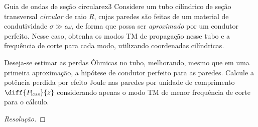 \begin{exercício}{Guia de ondas de seção circular}{ex3}
    Considere um tubo cilíndrico de seção transversal \emph{circular} de raio \(R\), cujas paredes são feitas de um material de condutividade \(\sigma \gg \epsilon \omega\), de forma que possa ser \emph{aproximado} por um condutor perfeito. Nesse caso, obtenha os modos TM de propagação nesse tubo e a frequência de corte para cada modo, utilizando coordenadas cilíndricas.

    Deseja-se estimar as perdas Ôhmicas no tubo, melhorando, mesmo que em uma primeira aproximação, a hipótese de condutor perfeito para as paredes. Calcule a potência perdida por efeito Joule nas paredes por unidade de comprimento \(\diff{P_\mathrm{loss}}{z}\) considerando apenas o modo TM de menor frequência de corte para o cálculo.
\end{exercício}
\begin{proof}[Resolução]
    
\end{proof}

